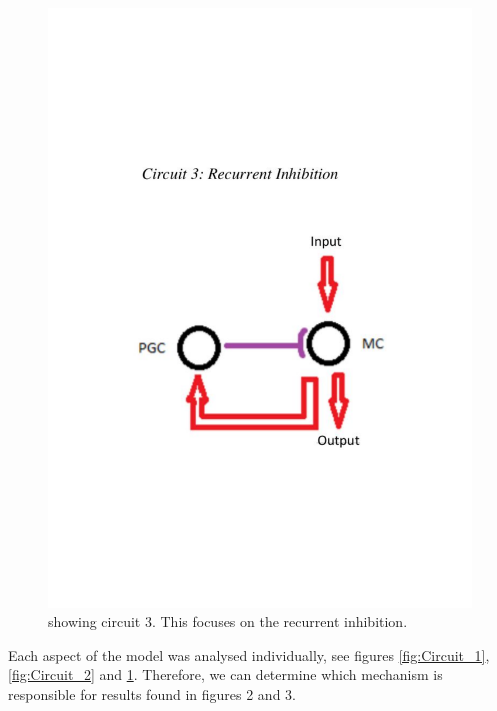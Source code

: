 \documentclass[11pt]{report}
\begin{document}
\begin{figure}[!ht]
\centering
\includegraphics[trim={0 6cm 0 6cm},clip, scale=0.5]{Figures/Circuit_3.pdf}
\caption{showing circuit 3. This focuses on the recurrent inhibition.}
\label{fig:Circuit_3}
\end{figure} 

Each aspect of the model was analysed individually, see figures \ref{fig:Circuit_1}, \ref{fig:Circuit_2} and \ref{fig:Circuit_3}. Therefore, we can determine which mechanism is responsible for results found in figures 2 and 3.
\newpage
\end{document}

